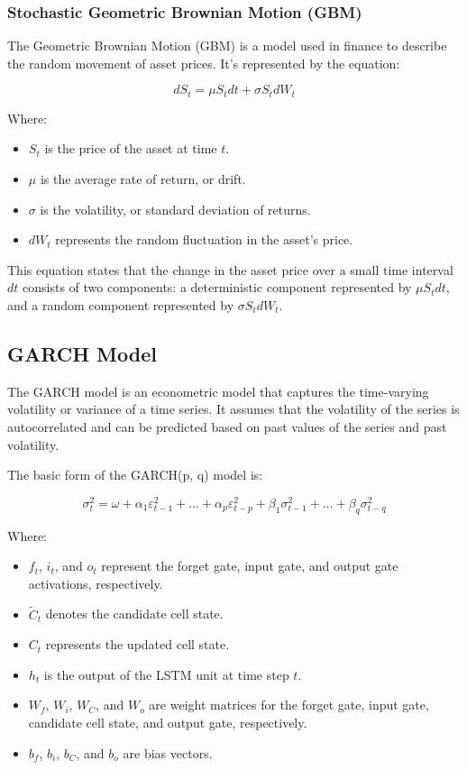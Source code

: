 \subsubsection{Stochastic Geometric Brownian Motion (GBM)}

The Geometric Brownian Motion (GBM) is a model used in finance to describe the random movement of asset prices. It's represented by the equation:

\begin{equation}\label{eq:stochastic_diff_eq}
dS_t = \mu S_t dt + \sigma S_t dW_t
\end{equation}

Where:

\begin{itemize}
    \item $S_t$ is the price of the asset at time $t$.
    \item $\mu$ is the average rate of return, or drift.
    \item $\sigma$ is the volatility, or standard deviation of returns.
    \item $dW_t$ represents the random fluctuation in the asset's price.
\end{itemize}

This equation states that the change in the asset price over a small time interval \( dt \) consists of two components: a deterministic component represented by \( \mu S_t dt \), and a random component represented by \( \sigma S_t dW_t \).

\subsection{GARCH Model}

The GARCH model is an econometric model that captures the time-varying volatility or variance of a time series. It assumes that the volatility of the series is autocorrelated and can be predicted based on past values of the series and past volatility.

The basic form of the GARCH(p, q) model is:

\begin{equation}\label{eq:garch_model}
\sigma_{t}^2 = \omega + \alpha_{1}\varepsilon_{t-1}^2 + \ldots + \alpha_{p}\varepsilon_{t-p}^2 + \beta_{1}\sigma_{t-1}^2 + \ldots + \beta_{q}\sigma_{t-q}^2
\end{equation}

Where:

\begin{itemize}
    \item $f_t$, $i_t$, and $o_t$ represent the forget gate, input gate, and output gate activations, respectively.
    \item $\tilde{C}_t$ denotes the candidate cell state.
    \item $C_t$ represents the updated cell state.
    \item $h_t$ is the output of the LSTM unit at time step $t$.
    \item $W_f$, $W_i$, $W_C$, and $W_o$ are weight matrices for the forget gate, input gate, candidate cell state, and output gate, respectively.
    \item $b_f$, $b_i$, $b_C$, and $b_o$ are bias vectors.
\end{itemize}
